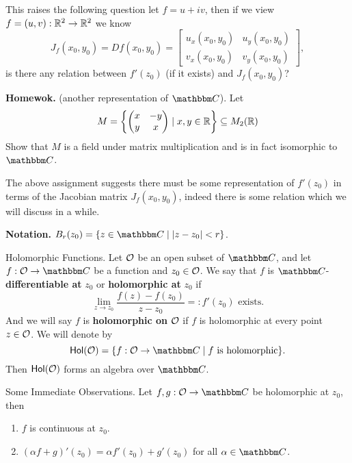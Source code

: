 \documentclass[../ComplexAnalysis_Notes.tex]{subfiles}
\begin{document}
This raises the following question let $f = u + i v$, then if we view $f = (u,v) : \mathbb{R}^2 \to \mathbb{R}^2$ we know
\[
  J_f(x_0,y_0) = Df(x_0,y_0) = \begin{bmatrix}
    u_x(x_0,y_0) & u_y(x_0,y_0) \\ v_x(x_0,y_0) & v_y(x_0,y_0)
  \end{bmatrix},
\]
is there any relation between $f'(z_0)$ (if it exists) and $J_f(x_0,y_0)$?

\smallskip

\textbf{Homewok.} (another representation of $\C$). Let
\begin{equation}\label{eq1:lec1}
  M = \left\{ \begin{pmatrix} x & -y \\ y & x \end{pmatrix} \mid x,y \in \mathbb{R}  \right\} \subseteq M_2(\mathbb{R})
\end{equation}
Show that $M$ is a field under matrix multiplication and is in fact isomorphic to $\C$.

\smallskip

The above assignment suggests there must be some representation of $f'(z_0)$ in terms of the Jacobian matrix $J_f(x_0,y_0)$, indeed there is some relation which we will discuss in a while.

\textbf{Notation.} $B_r(z_0) = \{ z \in \C \mid |z - z_0| < r \}$.

\begin{Def}{Holomorphic Functions.}{}
  Let $\mathcal{O}$ be an open subset of $\C$, and let $f : \mO \to \C$ be a function and $z_0 \in \mathcal{O}$. We say that $f$ is $\C$-\textbf{differentiable at} $z_0$ or \textbf{holomorphic at} $z_0$ if
  \[
    \lim_{z \to z_0} \frac{f(z) - f(z_0)}{z - z_0} =: f'(z_0) \mbox{ exists.}
  \]
  And we will say $f$ is \textbf{holomorphic on} $\mathcal{O}$ if $f$ is holomorphic at every point $z \in \mathcal{O}$. We will denote by
  \[
    \Hol(\mO) = \{ f : \mO \to \C \mid f \mbox{ is holomorphic}\}.
  \]
  Then $\operatorname{\mathsf{Hol}}(\mathcal{O})$ forms an algebra over $\C$.
\end{Def}

\begin{Lem}{Some Immediate Observations.}{}
  Let $f,g : \mO \to \C$ be holomorphic at $z_0$, then
  \begin{enumerate}
    \item $f$ is continuous at $z_0$.
    \item $(\alpha f + g)'(z_0) = \alpha f'(z_0) + g'(z_0)$ for all $\alpha \in \C$.
  \end{enumerate}
\end{Lem}
\end{document}
